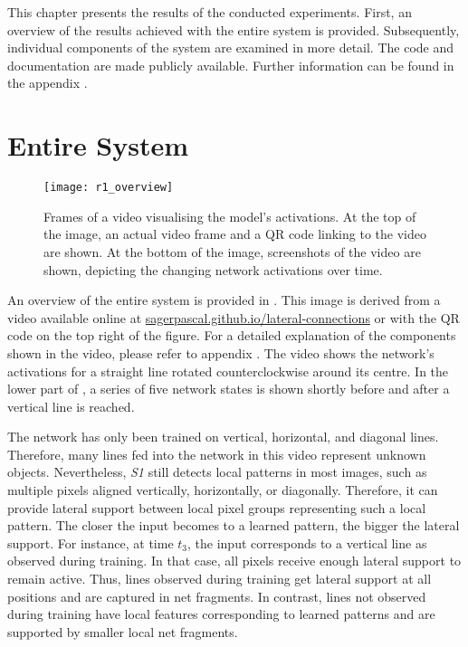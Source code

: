 This chapter presents the results of the conducted experiments. First, an overview of the results achieved with the entire system is provided. Subsequently, individual components of the system are examined in more detail.
The code and documentation are made publicly available. Further information can be found in the appendix .

\section{Entire System}
%
\begin{figure}[h]
    \centering
    \texttt{[image: r1\_overview]}
    \caption[Frames of a video visualising the model's activations]{Frames of a video visualising the model's activations. At the top of the image, an actual video frame and a QR code linking to the video are shown. At the bottom of the image, screenshots of the video are shown, depicting the changing network activations over time.}
\end{figure}
%
An overview of the entire system is provided in .
This image is derived from a video available online at \href{https://sagerpascal.github.io/lateral-connections/results/final_results.html#video-visualisations}{sagerpascal.github.io/lateral-connections} or with the QR code on the top right of the figure.
For a detailed explanation of the components shown in the video, please refer to appendix .
The video shows the network's activations for a straight line rotated counterclockwise around its centre.
In the lower part of , a series of five network states is shown shortly before and after a vertical line is reached.

The network has only been trained on vertical, horizontal, and diagonal lines.
Therefore, many lines fed into the network in this video represent unknown objects.
Nevertheless, \emph{S1} still detects local patterns in most images, such as multiple pixels aligned vertically, horizontally, or diagonally.
Therefore, it can provide lateral support between local pixel groups representing such a local pattern.
The closer the input becomes to a learned pattern, the bigger the lateral support.
For instance, at time $t_3$, the input corresponds to a vertical line as observed during training.
In that case, all pixels receive enough lateral support to remain active.
Thus, lines observed during training get lateral support at all positions and are captured in net fragments. In contrast, lines not observed during training have local features corresponding to learned patterns and are supported by smaller local net fragments.

